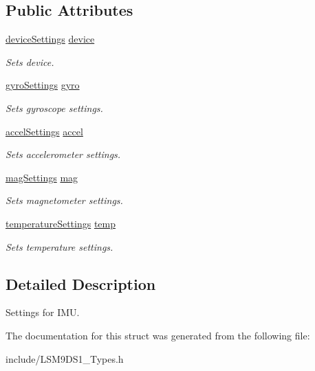 \subsection*{Public Attributes}
\begin{DoxyCompactItemize}
\item 
\mbox{\label{structIMUSettings_a22b2648befc58307b43edc9e74acd583}} 
\hyperlink{structdeviceSettings}{device\+Settings} \hyperlink{structIMUSettings_a22b2648befc58307b43edc9e74acd583}{device}
\begin{DoxyCompactList}\small\item\em Sets device. \end{DoxyCompactList}\item 
\mbox{\label{structIMUSettings_afab65feef7d0ca778b035a8805b1e4bf}} 
\hyperlink{structgyroSettings}{gyro\+Settings} \hyperlink{structIMUSettings_afab65feef7d0ca778b035a8805b1e4bf}{gyro}
\begin{DoxyCompactList}\small\item\em Sets gyroscope settings. \end{DoxyCompactList}\item 
\mbox{\label{structIMUSettings_aa8c7bf392c70397ae02ee1f5ad0ea474}} 
\hyperlink{structaccelSettings}{accel\+Settings} \hyperlink{structIMUSettings_aa8c7bf392c70397ae02ee1f5ad0ea474}{accel}
\begin{DoxyCompactList}\small\item\em Sets accelerometer settings. \end{DoxyCompactList}\item 
\mbox{\label{structIMUSettings_aca08359dfa3b8120aa687680d6c06ba7}} 
\hyperlink{structmagSettings}{mag\+Settings} \hyperlink{structIMUSettings_aca08359dfa3b8120aa687680d6c06ba7}{mag}
\begin{DoxyCompactList}\small\item\em Sets magnetometer settings. \end{DoxyCompactList}\item 
\mbox{\label{structIMUSettings_a55a77555f1843c186db02080078632f2}} 
\hyperlink{structtemperatureSettings}{temperature\+Settings} \hyperlink{structIMUSettings_a55a77555f1843c186db02080078632f2}{temp}
\begin{DoxyCompactList}\small\item\em Sets temperature settings. \end{DoxyCompactList}\end{DoxyCompactItemize}


\subsection{Detailed Description}
Settings for I\+MU. 

The documentation for this struct was generated from the following file\+:\begin{DoxyCompactItemize}
\item 
include/L\+S\+M9\+D\+S1\+\_\+\+Types.\+h\end{DoxyCompactItemize}
